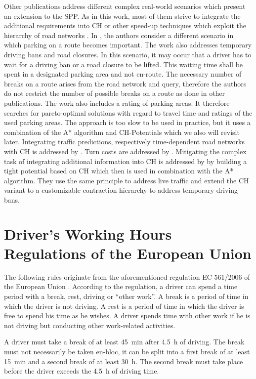 Other publications address different complex real-world scenarios which present an extension to the SPP. As in this work, most of them strive to integrate the additional requirements into CH or other speed-up techniques which exploit the hierarchy of road networks \cite{bast:2015}. In \cite{kleff:2020}, the authors consider a different scenario in which parking on a route becomes important. The work also addresses temporary driving bans and road closures. In this scenario, it may occur that a driver has to wait for a driving ban or a road closure to be lifted. This waiting time shall be spent in a designated parking area and not en-route. The necessary number of breaks on a route arises from the road network and query, therefore the authors do not restrict the number of possible breaks on a route as done in other publications. The work also includes a rating of parking areas. It therefore searches for pareto-optimal solutions with regard to travel time and ratings of the used parking areas. The approach is too slow to be used in practice, but it uses a combination of the A* algorithm and CH-Potentials which we also will revisit later. Integrating traffic predictions, respectively time-dependent road networks with CH is addressed by \cite{batz:2009,batz:2013}. Turn costs are addressed by \cite{geisberger:2011}. Mitigating the complex task of integrating additional information into CH is addressed by \cite{strasser:2021} by building a tight potential based on CH which then is used in combination with the A* algorithm. They use the same principle to address live traffic and extend the CH variant to a customizable contraction hierarchy \cite{dibbelt:2015} to address temporary driving bans.


\section{Driver's Working Hours Regulations of the European Union\label{sec:dwh_eu}}
The following rules originate from the aforementioned regulation EC 561/2006 of the European Union \cite{europeanparliament:2006}. According to the regulation, a driver can spend a time period with a break, rest, driving or ``other work''. A break is a period of time in which the driver is not driving. A rest is a period of time in which the driver is free to spend his time as he wishes. A driver spends time with other work if he is not driving but conducting other work-related activities.

A driver must take a break of at least \SI{45}{\minute} after \SI{4.5}{\hour} of driving. The break must not necessarily be taken en-bloc, it can be split into a first break of at least \SI{15}{\minute} and a second break of at least \SI{30}{\hour}. The second break must take place before the driver exceeds the \SI{4.5}{\hour} of driving time.

